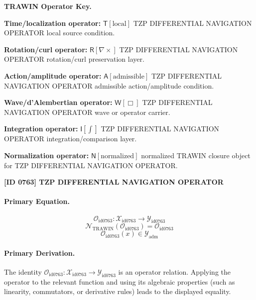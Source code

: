\par\vspace{0.45\baselineskip}
\noindent\begin{minipage}[t]{\linewidth}
\begingroup
\small
\raggedright
\textbf{TRAWIN Operator Key.}\par
\noindent\textbf{Time/localization operator:} $\mathsf{T}\!\left[\mathrm{local}\right]$ TZP DIFFERENTIAL NAVIGATION OPERATOR local source condition.\par
\noindent\textbf{Rotation/curl operator:} $\mathsf{R}\!\left[\nabla\times\right]$ TZP DIFFERENTIAL NAVIGATION OPERATOR rotation/curl preservation layer.\par
\noindent\textbf{Action/amplitude operator:} $\mathsf{A}\!\left[\mathrm{admissible}\right]$ TZP DIFFERENTIAL NAVIGATION OPERATOR admissible action/amplitude condition.\par
\noindent\textbf{Wave/d'Alembertian operator:} $\mathsf{W}\!\left[\Box\right]$ TZP DIFFERENTIAL NAVIGATION OPERATOR wave or operator carrier.\par
\noindent\textbf{Integration operator:} $\mathsf{I}\!\left[\int\right]$ TZP DIFFERENTIAL NAVIGATION OPERATOR integration/comparison layer.\par
\noindent\textbf{Normalization operator:} $\mathsf{N}\!\left[\mathrm{normalized}\right]$ normalized TRAWIN closure object for TZP DIFFERENTIAL NAVIGATION OPERATOR.\par
\endgroup
\end{minipage}

\clearpage
\noindent\textbf{[ID 0763] TZP DIFFERENTIAL NAVIGATION OPERATOR}\par
\vspace{0.35em}
\paragraph{Primary Equation.}
\[
\mathcal{O}_{\mathrm{id0763}}:\mathcal{X}_{\mathrm{id0763}}\longrightarrow\mathcal{Y}_{\mathrm{id0763}}
\]
\[
\mathcal{N}_{\mathrm{TRAWIN}}(\mathcal{O}_{\mathrm{id0763}})=\mathcal{O}_{\mathrm{id0763}}
\]
\[
\mathcal{O}_{\mathrm{id0763}}(x)\in\mathcal{Y}_{\mathrm{adm}}
\]

\paragraph{Primary Derivation.}
The identity \( \mathcal{O}_{\mathrm{id0763}}:\mathcal{X}_{\mathrm{id0763}}\longrightarrow\mathcal{Y}_{\mathrm{id0763}} \) is an operator relation. Applying the operator to the relevant function and using its algebraic properties (such as linearity, commutators, or derivative rules) leads to the displayed equality.
